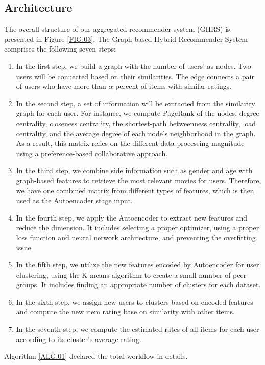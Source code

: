 \documentclass[a4paper,fleqn]{cas-dc}
\begin{document}
\subsection{Architecture}
\label{architecture}
The overall structure of our aggregated recommender system (GHRS) is presented in Figure \ref{FIG:03}. The Graph-based Hybrid Recommender System comprises the following seven steps:
\begin{enumerate}
\item
In the first step, we build a graph with the number of users' as nodes. Two users will be connected based on their similarities. The edge connects a pair of users who have more than $\alpha$ percent of items with similar ratings.
\item
In the second step, a set of information will be extracted from the similarity graph for each user. For instance, we compute PageRank of the nodes, degree centrality, closeness centrality, the shortest-path betweenness centrality, load centrality, and the average degree of each node's neighborhood in the graph. As a result, this matrix relies on the different data processing magnitude using a preference-based collaborative approach.
\item
In the third step, we combine side information such as gender and age with graph-based features to retrieve the most relevant movies for users. Therefore, we have one combined matrix from different types of features, which is then used as the Autoencoder stage input.
\item
In the fourth step, we apply the Autoencoder to extract new features and reduce the dimension. It includes selecting a proper optimizer, using a proper loss function and neural network architecture, and preventing the overfitting issue.
\item
In the fifth step, we utilize the new features encoded by Autoencoder for user clustering, using the K-means algorithm to create a small number of peer groups. It includes finding an appropriate number of clusters for each dataset.
\item
In the sixth step, we assign new users to clusters based on encoded features and compute the new item rating base on similarity with other items.
\item
In the seventh step, we compute the estimated rates of all items for each user according to its cluster's average rating..
\end{enumerate}
  
Algorithm \ref{ALG:01} declared the total workflow in details.
\end{document}
